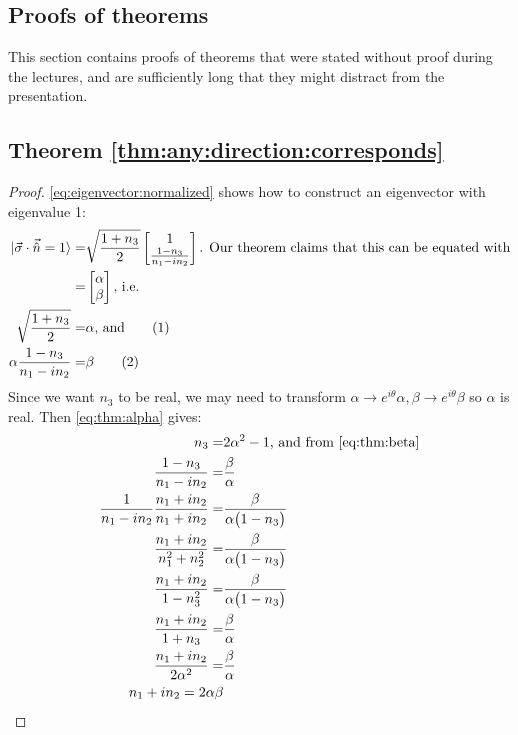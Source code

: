 \documentclass[]{article}
\newcommand\numberthis{\addtocounter{equation}{1}\tag{\theequation}}
\begin{document}
\begin{appendices}
	\section {Proofs of theorems}
	This section contains proofs of theorems that were stated without proof during the lectures, and are sufficiently long that they might distract from the presentation.
	\subsection{Theorem \ref{thm:any:direction:corresponds}}\label{proof:any:direction:corresponds}
	\begin{proof}
		\eqref{eq:eigenvector:normalized} shows how to construct an eigenvector with eigenvalue 1:
		\begin{align*}
		\ket{\vec{\sigma} \cdot \vec{\hat{n}}=1} =& \sqrt{\frac{1+n_3}{2}} \begin{bmatrix}
		1\\\frac{1-n_3}{n_1-i n_2}
		\end{bmatrix}\text{. Our theorem claims that this can be equated with} \\
		=& \begin{bmatrix}
		\alpha\\
		\beta
		\end{bmatrix} \text{, i.e.}\\
		\sqrt{\frac{1+n_3}{2}} =& \alpha \text{, and} \numberthis \label{eq:thm:alpha}\\
		\alpha \frac{1-n_3}{n_1-i n_2} =& \beta \numberthis \label{eq:thm:beta} 
		\end{align*}
		Since we want $n_3$ to be real, we may need to transform $\alpha \rightarrow e^{i\theta}\alpha, \beta \rightarrow e^{i\theta}\beta$ so $\alpha$ is real. Then \eqref{eq:thm:alpha} gives:
		\begin{align*}
		n_3 =& 2 \alpha^2-1 \text{, and from \eqref{eq:thm:beta}}\\
		\frac{1-n_3}{n_1-i n_2} =& \frac{\beta}{\alpha}\\
		\frac{1}{n_1-i n_2}\frac{{n_1+i n_2}}{{n_1+i n_2}}=&\frac{\beta}{\alpha\big(1-n_3\big)}\\
		\frac{{n_1+i n_2}}{{n_1^2+ n_2^2}} =& \frac{\beta}{\alpha\big(1-n_3\big)}\\
		\frac{{n_1+i n_2}}{{1- n_3^2}} =&\frac{\beta}{\alpha\big(1-n_3\big)}\\
		\frac{{n_1+i n_2}}{1+ n_3} =&\frac{\beta}{\alpha}\\
		\frac{{n_1+i n_2}}{2 \alpha^2} =&\frac{\beta}{\alpha}\\
		n_1+i n_2 = 2\alpha\beta
		\end{align*} 
	\end{proof}

\end{appendices}
\end{document}
